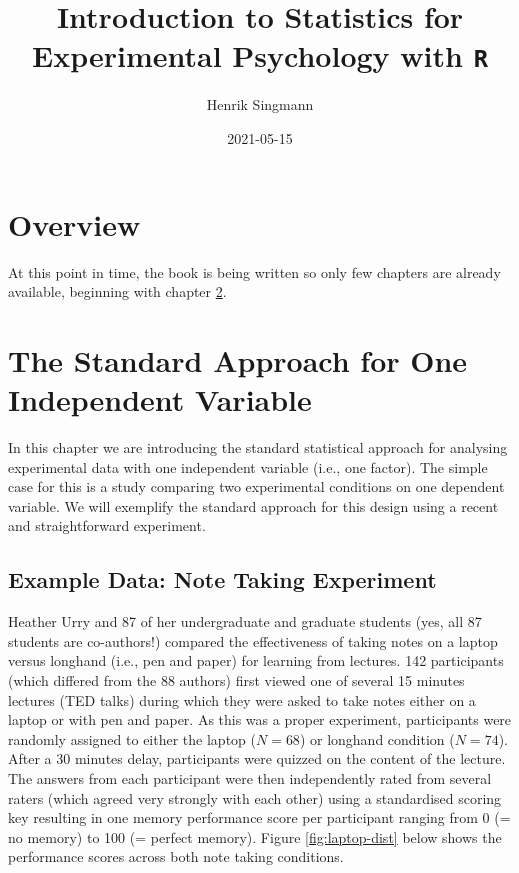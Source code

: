 \documentclass[
]{book}
\title{Introduction to Statistics for Experimental Psychology with \texttt{R}}
\author{Henrik Singmann}
\date{2021-05-15}
\begin{document}
\maketitle

{
\setcounter{tocdepth}{1}
\tableofcontents
}
\hypertarget{overview}{%
\chapter{Overview}\label{overview}}

At this point in time, the book is being written so only few chapters are already available, beginning with chapter \ref{standard1}.

\hypertarget{standard1}{%
\chapter{The Standard Approach for One Independent Variable}\label{standard1}}

In this chapter we are introducing the standard statistical approach for analysing experimental data with one independent variable (i.e., one factor). The simple case for this is a study comparing two experimental conditions on one dependent variable. We will exemplify the standard approach for this design using a recent and straightforward experiment.

\hypertarget{ex:urry}{%
\section{Example Data: Note Taking Experiment}\label{ex:urry}}

Heather Urry and 87 of her undergraduate and graduate students \citep{urry2021} (yes, all 87 students are co-authors!) compared the effectiveness of taking notes on a laptop versus longhand (i.e., pen and paper) for learning from lectures. 142 participants (which differed from the 88 authors) first viewed one of several 15 minutes lectures (TED talks) during which they were asked to take notes either on a laptop or with pen and paper. As this was a proper experiment, participants were randomly assigned to either the laptop (\(N = 68\)) or longhand condition (\(N = 74\)). After a 30 minutes delay, participants were quizzed on the content of the lecture. The answers from each participant were then independently rated from several raters (which agreed very strongly with each other) using a standardised scoring key resulting in one memory performance score per participant ranging from 0 (= no memory) to 100 (= perfect memory). Figure \ref{fig:laptop-dist} below shows the performance scores across both note taking conditions.
\end{document}

